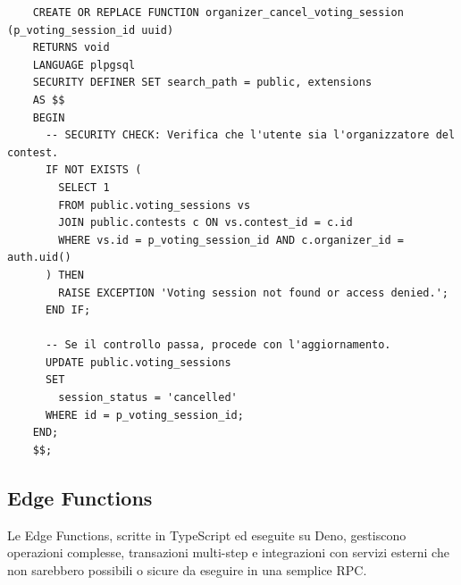 \begin{longlisting}
    \begin{verbatim}
    CREATE OR REPLACE FUNCTION organizer_cancel_voting_session (p_voting_session_id uuid)
    RETURNS void
    LANGUAGE plpgsql
    SECURITY DEFINER SET search_path = public, extensions
    AS $$
    BEGIN
      -- SECURITY CHECK: Verifica che l'utente sia l'organizzatore del contest.
      IF NOT EXISTS (
        SELECT 1
        FROM public.voting_sessions vs
        JOIN public.contests c ON vs.contest_id = c.id
        WHERE vs.id = p_voting_session_id AND c.organizer_id = auth.uid()
      ) THEN
        RAISE EXCEPTION 'Voting session not found or access denied.';
      END IF;

      -- Se il controllo passa, procede con l'aggiornamento.
      UPDATE public.voting_sessions
      SET
        session_status = 'cancelled'
      WHERE id = p_voting_session_id;
    END;
    $$;
    \end{verbatim}
    \caption{Implementazione della funzione RPC ``organizer\_cancel\_voting\_session'', che mostra il pattern di controllo dei permessi lato server.}
    \label{lst:rpc_security_check_example}
\end{longlisting}

\subsection{Edge Functions}\label{subsec:edge-functions}
Le Edge Functions, scritte in TypeScript ed eseguite su Deno, gestiscono operazioni complesse, transazioni multi-step e integrazioni con servizi esterni che non sarebbero possibili o sicure da eseguire in una semplice RPC\@.

